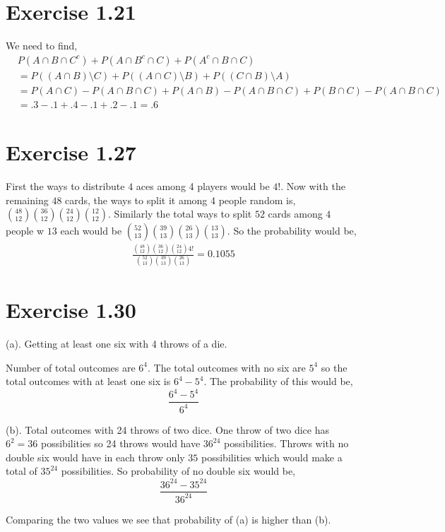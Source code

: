 \documentclass[a4paper]{report}
\begin{document}
\section*{Exercise 1.21}
We need to find, 
\begin{align*}
    &P(A \cap B \cap C^{c})  +  P(A \cap B^{c} \cap C) +  P(A^{c} \cap B \cap C) \\&=P((A \cap B)\setminus  C)  + P((A \cap C)\setminus  B)  + P((C \cap B)\setminus  A) \\
    &= P(A \cap C) - P(A \cap B \cap  C)  + P(A \cap B) - P(A \cap B \cap  C)  + P(B \cap C) - P(A \cap B \cap  C) \\
    &= .3 - .1 + .4 - .1 + .2 - .1 = .6
\end{align*}
\section*{Exercise 1.27}
First the ways to distribute $4$ aces among 4 players would be $4!$. Now with the remaining  $48$ cards, the ways to split it among 4 people random is, ${48 \choose 12}{36 \choose 12}{24 \choose 12}{12 \choose 12}$. Similarly the total ways to split $52$ cards among  $4$ people w $13$ each would be ${52 \choose 13}{39 \choose 13}{26 \choose 13}{13 \choose 13}$. So the probability would be, 
\begin{align*}
\frac{{48 \choose 12}{36 \choose 12}{24 \choose 12}4!}{{52 \choose 13}{39 \choose 13}{26 \choose 13}} = 0.1055
\end{align*}


\section*{Exercise 1.30}

(a). Getting  at least one six with 4 throws of a die.

Number of total outcomes are $6^{4}$. The total outcomes with no six are $5^{4}$ so the total outcomes with at least one six is $6^{4} - 5^{4}$. The probability of this would be, 
$$ \frac{6^{4} - 5^{4}}{6^{4}} $$ 


(b). Total outcomes with 24 throws of two dice. One throw of two dice has $6^2 = 36$ possibilities so 24 throws would have $36^{24}$ possibilities. Throws with no double six would  have in each throw only $35$ possibilities which would make a total of $35^{24}$ possibilities. So probability of no double six would be, 
$$ \frac{36^{24} - 35^{24}}{36^{24}} $$ 


Comparing the two values we see that probability of (a) is higher than (b).
\end{document}
